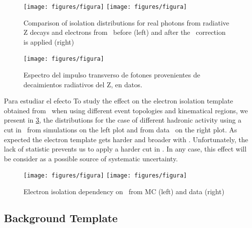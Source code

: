 \begin{figure}[h]
  \begin{center}
    \texttt{[image: figures/figura]} %
    \texttt{[image: figures/figura]} %
    \caption{Comparison of isolation distributions  for real photons from radiative
      Z decays and electrons from \Zee\ before (left) and after the \pt\ correction
      is applied (right)}
    \label{fig:photon_electron_iso}
  \end{center}
\end{figure}

\begin{figure}[h]
  \begin{center}
    \texttt{[image: figures/figura]}
    \caption{Espectro del impulso transverso de fotones provenientes de decaimientos
      radiativos del Z, en datos.}
    \label{fig:zllg_pt}
  \end{center}
\end{figure}

Para estudiar el efecto To study the effect on the electron isolation template obtained from \Zee\ when using different
event topologies and kinematical regions, we present in {\fig} \ref{fig:_electron_iso_HT},
the distributions for the case of different hadronic activity using a cut in \HT\ from simulations
on the left plot and from data \Zee\ on the right plot. As expected the electron template gets harder
and broader with \HT.  Unfortunately, the lack of statistic prevents us to apply a harder cut in \HT.
In any case, this effect will be consider as a possible source of systematic uncertainty.

\begin{figure}[h]
  \begin{center}
    \texttt{[image: figures/figura]}
    \texttt{[image: figures/figura]}
    \caption{Electron isolation dependency on \HT\ from MC (left) and data (right) \Zee}
    \label{fig:_electron_iso_HT}
  \end{center}
\end{figure}

\subsection{Background Template} \label{sec:jfake_bkg_template}

